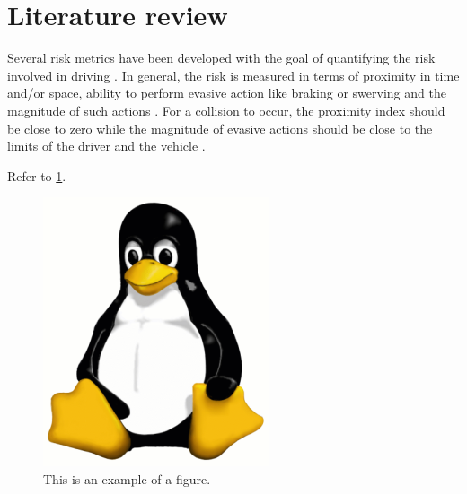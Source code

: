 \section{Literature review}
\label{sec:literature review}

Several risk metrics have been developed with the goal of quantifying the risk involved in driving \autocite{minderhoud2001extended, ozbay2008derivation, cunto2009simulated, laureshyn2010evaluation}.
In general, the risk is measured in terms of proximity in time and/or space, ability to perform evasive action like braking or swerving and the magnitude of such actions \autocite{shi2018key,zheng2020modeling}. 
For a collision to occur, the proximity index should be close to zero while the magnitude of evasive actions should be close to the limits of the driver and the vehicle \autocite{zheng2020modeling}. 

Refer to \cref{fig:tux}.

\begin{figure}
    \centering
    \includegraphics{figs/tux.png}
    \caption{This is an example of a figure.}
    \label{fig:tux}
\end{figure}
